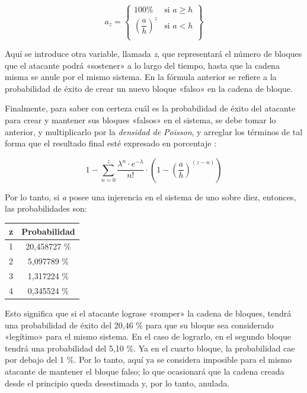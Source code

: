 \documentclass[12pt,a4paper,twoside]{book}
\begin{document}
\[
a_{z} =
\begin{Bmatrix}
100\% & \text{si } a \geq h \\
\left( \dfrac{a}{h} \right)^{z} & \text{si } a < h \\
\end{Bmatrix}
\]

Aquí se introduce otra variable, llamada \textit{z}, que representará el número de bloques que el atacante podrá «sostener» a lo largo del tiempo, hasta que la cadena misma se anule por el mismo sistema. En la fórmula anterior se refiere a la probabilidad de éxito de crear un nuevo bloque «falso» en la cadena de bloque.

Finalmente, para saber con certeza cuál es la probabilidad de éxito del atacante para crear y mantener sus bloques «falsos» en el sistema, se debe tomar lo anterior, y multiplicarlo por la \textit{densidad de Poisson}, y arreglar los términos de tal forma que el resultado final esté expresado en porcentaje \cite[págs. 6-7]{bitcoin:wpaper}:

\begin{Large}
\begin{equation*}
1 - \sum_{n=0}^{z} \dfrac{\lambda^{n} \cdot e^{-\lambda}}{n!} \cdot \left( 1 - \left( \dfrac{a}{h} \right)^{(z-n)} \right)
\end{equation*}
\end{Large}

Por lo tanto, si \textit{a} posee una injerencia en el sistema de uno sobre diez, entonces, las probabilidades son:

\begin{center}
\begin{longtable}{|c|c|}
\hline 
\textbf{z} & \textbf{Probabilidad} \\ 
\hline 
1 & 20,458727 \% \\ 
\hline 
2 & 5,097789 \% \\ 
\hline 
3 & 1,317224 \% \\ 
\hline 
4 & 0,345524 \% \\ 
\hline 
\end{longtable} 
\end{center}

Esto significa que si el atacante lograse «romper» la cadena de bloques, tendrá una probabilidad de éxito del 20,46 \% para que su bloque sea considerado «legítimo» para el mismo sistema. En el caso de lograrlo, en el segundo bloque tendrá una probabilidad del 5,10 \%. Ya en el cuarto bloque, la probabilidad cae por debajo del 1 \%. Por lo tanto, aquí ya se considera imposible para el mismo atacante de mantener el bloque falso; lo que ocasionará que la cadena creada desde el principio queda desestimada y, por lo tanto, anulada.
\end{document}
